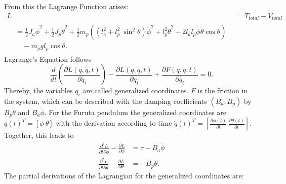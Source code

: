 From this the Lagrange Function arises:
\begin{align*}
L &=T_{total}-V_{total}\\
\begin{split}&=\frac{1}{2}J_a\dot{\phi}^2+\frac{1}{2}J_p\dot{\theta}^2+\frac{1}{2}m_p\left((l_a^2+l_p^2\
\sin^2\theta)\dot{\phi}^2+l_p^2\dot{\theta}^2+2l_al_p\dot{\phi}\dot{\theta}\cos 
\theta\right) \\&\quad - m_pgl_{p}\cos\theta.\end{split}
\end{align*}
 Lagrange's 
Equation follows \[ 
\frac{d}{dt}\left(\frac{\partial L(q, \dot{q},t)}{\partial 
	\dot{q_i}}\right)-\frac{\partial 
	L(q, \dot{q},t)}{\partial 
	q_i}+\frac{\partial F(q, \dot{q}, t)}{\partial \dot{q_i}} =0.\] Thereby, 
	the 
	variables 
	$q_i$ are called 
	generalized coordinates. $F$ is the friction in 
	the system, which can be described with the damping coefficients 
	$(B_a, B_p)$ by $B_p\dot{\theta}$ and $ 
	B_a\dot{\phi}$.
	For 
the Furuta pendulum the generalized coordinates are $q(t)^T=[\phi \ \theta]$ 
with 
the derivation according to time $\dot{q}(t)^T = 
\left[\frac{\partial 
	\phi(t)}{\partial t}\ \frac{\partial \theta(t)}{\partial t} \right]$. 
	Together, this
	leads 
to 
\begin{align}
\frac{\partial^2 L}{\partial t\partial \dot{\phi}}-\frac{\partial 
	L}{\partial \phi}&=\tau - B_a\dot{\phi} \label{eq:f1}\\
\frac{\partial^2 L}{\partial t\partial \dot{\theta}}-\frac{\partial 
	L}{\partial \theta}&=-B_p\dot{\theta}\label{eq:f2}.
\end{align}
The partial derivations of the Lagrangian for the generalized coordinates are:


